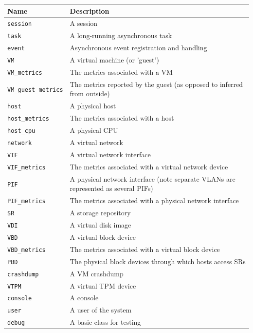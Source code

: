 \begin{center}\begin{tabular}{|lp{10cm}|}
\hline
Name & Description \\
\hline
{\tt session} & A session \\
{\tt task} & A long-running asynchronous task \\
{\tt event} & Asynchronous event registration and handling \\
{\tt VM} & A virtual machine (or 'guest') \\
{\tt VM\_metrics} & The metrics associated with a VM \\
{\tt VM\_guest\_metrics} & The metrics reported by the guest (as opposed to inferred from outside) \\
{\tt host} & A physical host \\
{\tt host\_metrics} & The metrics associated with a host \\
{\tt host\_cpu} & A physical CPU \\
{\tt network} & A virtual network \\
{\tt VIF} & A virtual network interface \\
{\tt VIF\_metrics} & The metrics associated with a virtual network device \\
{\tt PIF} & A physical network interface (note separate VLANs are represented as several PIFs) \\
{\tt PIF\_metrics} & The metrics associated with a physical network interface \\
{\tt SR} & A storage repository \\
{\tt VDI} & A virtual disk image \\
{\tt VBD} & A virtual block device \\
{\tt VBD\_metrics} & The metrics associated with a virtual block device \\
{\tt PBD} & The physical block devices through which hosts access SRs \\
{\tt crashdump} & A VM crashdump \\
{\tt VTPM} & A virtual TPM device \\
{\tt console} & A console \\
{\tt user} & A user of the system \\
{\tt debug} & A basic class for testing \\
\hline
\end{tabular}\end{center}
